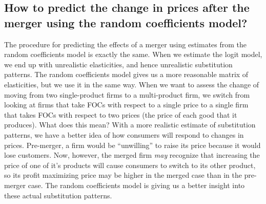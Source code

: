 \documentclass[dvipsnames]{article}
\begin{document}
\subsection*{How to predict the change in prices after the merger using the random coefficients model?}

The procedure for predicting the effects of a merger using estimates from the random coefficients model is exactly the same. When we estimate the logit model, we end up with unrealistic elasticities, and hence unrealistic substitution patterns. The random coefficients model gives us a more reasonable matrix of elasticities, but we use it in the same way. When we want to assess the change of moving from two single-product firms to a multi-product firm, we switch from looking at firms that take FOCs with respect to a single price to a single firm that takes FOCs with respect to two prices (the price of each good that it produces). What does this mean? With a more realistic estimate of substitution patterns, we have a better idea of how consumers will respond to changes in prices. Pre-merger, a firm would be ``unwilling'' to raise its price because it would lose customers. Now, however, the merged firm \emph{may} recognize that increasing the price of one of it's products will cause consumers to switch to its other product, so its profit maximizing price may be higher in the merged case than in the pre-merger case. The random coefficients model is giving us a better insight into these actual substitution patterns.


\newpage
\inputminted{python}{blp_hw.py}
\end{document}
